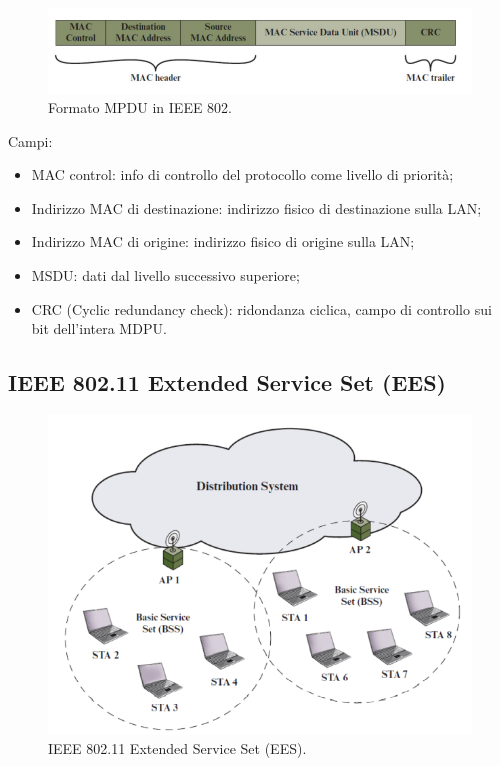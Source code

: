 \begin{figure}[h]
    \centering
    \includegraphics[width=1\textwidth]{images/chapter6/6-3.png}
    \caption{Formato MPDU in IEEE 802.}
    \label{fig:6-3}
\end{figure}

Campi:
\begin{itemize}
    \item MAC control: info di controllo del protocollo come livello di priorità;
	\item Indirizzo MAC di destinazione: indirizzo fisico di destinazione sulla LAN;
	\item Indirizzo MAC di origine: indirizzo fisico di origine sulla LAN;
	\item MSDU: dati dal livello successivo superiore;
	\item CRC (Cyclic redundancy check): ridondanza ciclica, campo di controllo sui bit dell'intera MDPU.
\end{itemize}

\subsection{IEEE 802.11 Extended Service Set (EES)} 

\begin{figure}[h]
    \centering
    \includegraphics[width=1\textwidth]{images/chapter6/6-4.png}
    \caption{IEEE 802.11 Extended Service Set (EES).}
    \label{fig:6-4}
\end{figure}

